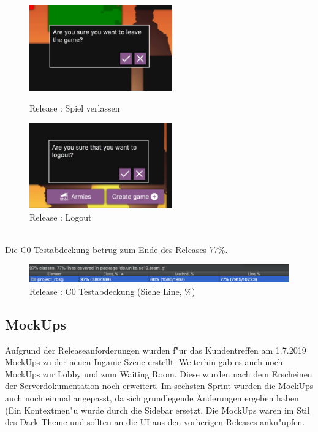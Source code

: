 \documentclass[12pt, titlepage]{scrartcl}
\newcommand{\RN}[1]{%
	\textup{\uppercase\expandafter{\romannumeral#1}}%
}
\begin{document}
		        \begin{figure}[H]
                    \centering
                    \begin{minipage}{0.55\textwidth}
                        \centering
                        \includegraphics[width=0.55\textwidth]{images/old_state/additional/LeaveGame.png}
                        \caption{Release \RN{2}: Spiel verlassen}
                        \label{Leave_Game}
                    \end{minipage}%
                    \begin{minipage}{0.55\textwidth}
                        \centering
                        \includegraphics[width=0.55\textwidth]{images/old_state/additional/Logout.png}
                        \caption{Release \RN{2}: Logout}
                        \label{Logout}
                    \end{minipage}
                \end{figure}
                \ \\ Die C0 Testabdeckung betrug zum Ende des Releases \RN{2} 77\%.
                \begin{figure}[H] 
    				\centering
    				\includegraphics[width=\textwidth]{images/old_state/Coverage.png}
    				\caption{Release \RN{2}: C0 Testabdeckung (Siehe Line, \%)}
    				\label{Coverage}
			    \end{figure}
    \newpage
	    \subsection{MockUps}
	        Aufgrund der Releaseanforderungen wurden f"ur das Kundentreffen am 1.7.2019 MockUps zu der neuen Ingame Szene erstellt. Weiterhin gab es auch noch MockUps zur Lobby und zum Waiting Room. Diese wurden nach dem Erscheinen der Serverdokumentation noch erweitert. Im sechsten Sprint wurden die MockUps auch noch einmal angepasst, da sich grundlegende \"Anderungen ergeben haben (Ein Kontextmen"u wurde durch die Sidebar ersetzt. Die MockUps waren im Stil des Dark Theme und sollten an die UI aus den vorherigen Releases ankn"upfen.
\end{document}
